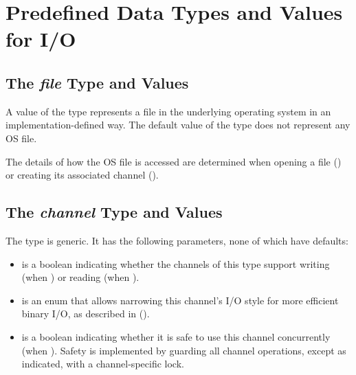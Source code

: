 

\section{Predefined Data Types and Values for I/O}
\label{IO_data_types}


\subsection{The {\em file} Type and Values}
\label{IO_file_type}

A value of the  type represents a file in the underlying
operating system in an implementation-defined way. The default value
of the  type does not represent any OS file.

The details of how the OS file is accessed are determined
when opening a file ()
or creating its associated channel ().


\subsection{The {\em channel} Type and Values}
\label{IO_channel_type}

The  type is generic. It has the following parameters,
none of which have defaults:

\begin{itemize}

\item {} is a boolean indicating whether the channels of this type
      support writing (when ) or reading (when ).

\item {} is an enum  that allows narrowing
      this channel's I/O style for more efficient binary I/O,
      as described in ().

\item {} is a boolean indicating whether it is
      safe to use this channel concurrently (when ).
      Safety is implemented by guarding all channel operations, except
      as indicated, with a channel-specific lock.

\end{itemize}


